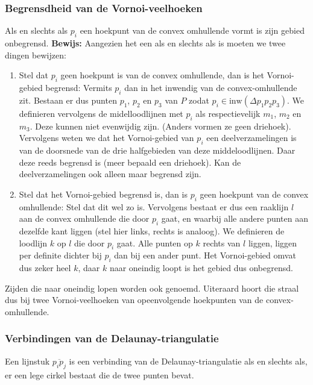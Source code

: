 \documentclass[a4paper,titlepage]{article}
\newcommand{\termen}[1]{\index{#1}\textbf{\sffamily{#1}}}
\newcommand{\inw}[1]{\mbox{inw}\left(#1\right)}
\newcommand{\linep}[1]{\overline{#1}}
\begin{document}
\subsubsection{Begrensdheid van de Vornoi-veelhoeken}
Als en slechts als $p_i$ een hoekpunt van de convex omhullende vormt is zijn gebied onbegrensd.
\textbf{Bewijs: }Aangezien het een als en slechts als is moeten we twee dingen bewijzen:
\begin{enumerate}
 \item Stel dat $p_i$ geen hoekpunt is van de convex omhullende, dan is het Vornoi-gebied begrensd: Vermits $p_i$ dan in het inwendig van de convex-omhullende zit. Bestaan er dus punten $p_1$, $p_2$ en $p_3$ van $P$ zodat $p_i\in\inw{\Delta p_1p_2p_3}$. We definieren vervolgens de midelloodlijnen met $p_i$ als respectievelijk $m_1$, $m_2$ en $m_3$. Deze kunnen niet evenwijdig zijn. (Anders vormen ze geen driehoek). Vervolgens weten we dat het Vornoi-gebied van $p_i$ een deelverzamelingen is van de doorsnede van de drie halfgebieden van deze middeloodlijnen. Daar deze reeds begrensd is (meer bepaald een driehoek). Kan de deelverzamelingen ook alleen maar begrensd zijn.
 \item Stel dat het Vornoi-gebied begrensd is, dan is $p_i$ geen hoekpunt van de convex omhullende: Stel dat dit wel zo is. Vervolgens bestaat er dus een raaklijn $l$ aan de convex omhullende die door $p_i$ gaat, en waarbij alle andere punten aan dezelfde kant liggen (stel hier links, rechts is analoog). We definieren de loodlijn $k$ op $l$ die door $p_i$ gaat. Alle punten op $k$ rechts van $l$ liggen, liggen per definite dichter bij $p_i$ dan bij een ander punt. Het Vornoi-gebied omvat dus zeker heel $k$, daar $k$ naar oneindig loopt is het gebied dus onbegrensd.
\end{enumerate}
Zijden die naar oneindig lopen worden ook \termen{stralen} genoemd. Uiteraard hoort die straal dus bij twee Vornoi-veelhoeken van opeenvolgende hoekpunten van de convex-omhullende.
\subsubsection{Verbindingen van de Delaunay-triangulatie}
\label{subsec:delaunayBigoh}
Een lijnstuk $\linep{p_ip_j}$ is een verbinding van de Delaunay-triangulatie als en slechts als, er een lege cirkel bestaat die de twee punten bevat.
\end{document}
